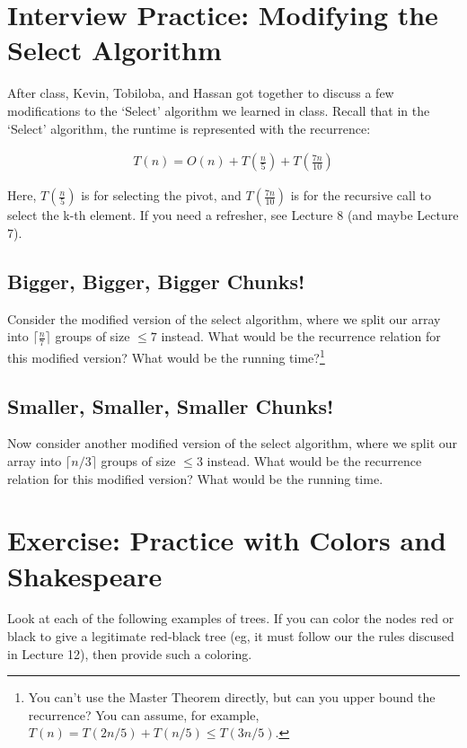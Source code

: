 \documentclass [12pt]{article}
\begin{document}
\section{Interview Practice: Modifying the Select Algorithm }

After class, Kevin, Tobiloba, and Hassan got together to discuss a few modifications to the `Select' algorithm we learned in class. Recall that in the `Select' algorithm, the runtime is represented with the recurrence:

\begin{align*}
T(n) = O(n) + T\left(\frac{n}{5}\right) + T\left(\frac{7n}{10}\right)
\end{align*}

Here, $T(\frac{n}{5})$ is for selecting the pivot, and $T(\frac{7n}{10})$ is for the recursive call to select the k-th element. If you need a refresher, see Lecture 8 (and maybe Lecture 7). 


\subsection{Bigger, Bigger, Bigger Chunks! }

Consider the modified version of the select algorithm, where we split our array into $\lceil \frac{n}{7}\rceil$ groups of size $\leq 7$ instead. What would be the recurrence relation for this modified version? What would be the running time?\footnote{You can't use the Master Theorem directly, but can you upper bound the recurrence? You can assume, for example, $T(n) = T(2n/5) + T(n/5) \leq T(3n/5)$.}


\subsection{Smaller, Smaller, Smaller Chunks! }

Now consider another modified version of the select algorithm, where we split our array into $\lceil n/3 \rceil$ groups of size $\leq 3$ instead. What would be the recurrence relation for this modified version? What would be the running time.



\pagebreak
\section{Exercise: Practice with Colors and Shakespeare }
Look at each of the following examples of trees. If you can color the nodes red or black to give a legitimate red-black tree (eg, it must follow our the rules discused in Lecture 12), then provide such a coloring. 
\end{document}
